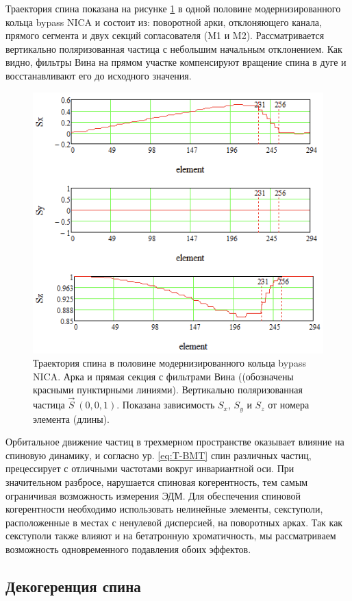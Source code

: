 \par Траектория спина показана на рисунке \ref{fig:4bypassspin} в одной половине модернизированного кольца bypass NICA и состоит из: поворотной арки, отклоняющего канала, прямого сегмента и двух секций согласователя (M1 и M2). Рассматривается вертикально поляризованная частица с небольшим начальным отклонением. Как видно, фильтры Вина на прямом участке компенсируют вращение спина в дуге и восстанавливают его до исходного значения.

\begin{figure}[!h]
	\centering
	\includegraphics[width=0.7\linewidth]{images/4_bypass_spin}
	\caption{Траектория спина в половине модернизированного кольца bypass NICA. Арка и прямая секция с фильтрами Вина ((обозначены красными пунктирными линиями). Вертикально поляризованная частица $\vec{S}~(0,0,1)$. Показана зависимость $S_{x}$, $S_{y}$ и $S_{z}$ от номера элемента (длины).}
	\label{fig:4bypassspin}
\end{figure}

\par Орбитальное движение частиц в трехмерном пространстве оказывает влияние на спиновую динамику, и согласно ур. \ref{eq:T-BMT} спин различных частиц, прецессирует с отличными частотами вокруг инвариантной оси. При значительном разбросе, нарушается спиновая когерентность, тем самым ограничивая возможность измерения ЭДМ. Для обеспечения спиновой когерентности необходимо использовать нелинейные элементы, секступоли, расположенные в местах с ненулевой дисперсией, на поворотных арках. Так как секступоли также влияют и на бетатронную хроматичность, мы рассматриваем возможность одновременного подавления обоих эффектов.

		\subsection{Декогеренция спина}\label{sec:EDM/Wien_filter_tracking/decoherence}

